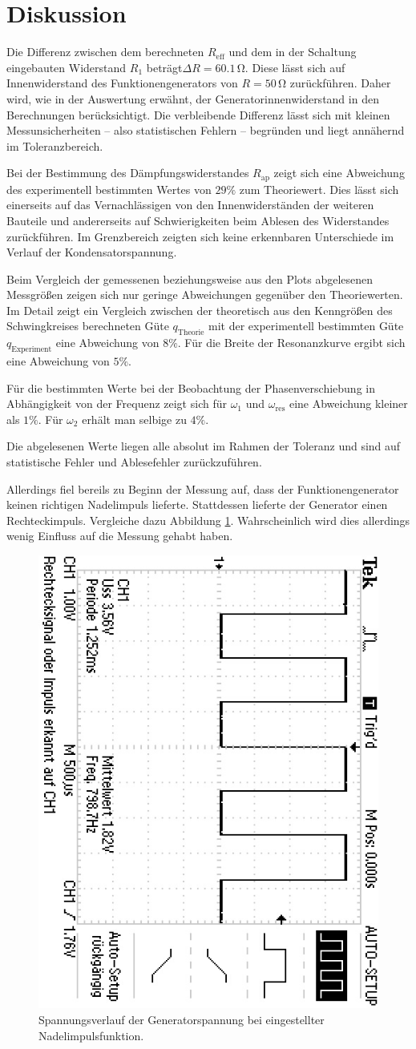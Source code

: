 \section{Diskussion}
\label{sec:Diskussion}
Die Differenz zwischen dem berechneten $R_\text{eff}$ und dem in der Schaltung eingebauten Widerstand $R_\text{1}$ beträgt$\Delta R=60.1 \,\si{\ohm}$.
Diese lässt sich auf Innenwiderstand des Funktionengenerators von $R=50\,\si{\ohm}$ zurückführen.
Daher wird, wie in der Auswertung erwähnt, der Generatorinnenwiderstand in den Berechnungen berücksichtigt.
Die verbleibende Differenz lässt sich mit kleinen Messunsicherheiten -- also statistischen Fehlern -- begründen und liegt annähernd im Toleranzbereich.

Bei der Bestimmung des Dämpfungswiderstandes $R_{\mathrm{ap}}$ zeigt sich eine Abweichung
des experimentell bestimmten Wertes von $29\%$ zum Theoriewert. Dies lässt sich einerseits
auf das Vernachlässigen von den Innenwiderständen der weiteren Bauteile und
andererseits auf Schwierigkeiten beim Ablesen des Widerstandes zurückführen. Im Grenzbereich zeigten
sich keine erkennbaren Unterschiede im Verlauf der Kondensatorspannung.

Beim Vergleich der gemessenen beziehungsweise aus den Plots abgelesenen Messgrößen zeigen sich nur geringe Abweichungen gegenüber den Theoriewerten.
Im Detail zeigt ein Vergleich zwischen der theoretisch aus den Kenngrößen des Schwingkreises berechneten Güte $q_\mathrm{Theorie}$ mit der experimentell bestimmten Güte $q_\mathrm{Experiment}$ eine Abweichung von $8\%$.
Für die Breite der Resonanzkurve ergibt sich eine Abweichung von $5\%$.

Für die bestimmten Werte bei der Beobachtung der Phasenverschiebung in Abhängigkeit von der
Frequenz zeigt sich für $\omega_1$ und $\omega_{\mathrm{res}}$ eine Abweichung kleiner als $1\%$. Für $\omega_2$ erhält man selbige zu $4\%$.

Die abgelesenen Werte liegen alle absolut im Rahmen der Toleranz und sind auf statistische Fehler
und Ablesefehler zurückzuführen.

Allerdings fiel bereils zu Beginn der Messung auf, dass der Funktionengenerator keinen richtigen Nadelimpuls lieferte. Stattdessen lieferte der Generator einen Rechteckimpuls. Vergleiche dazu Abbildung \ref{fig:blabliblub}.
Wahrscheinlich wird dies allerdings wenig Einfluss auf die Messung gehabt haben.

\begin{figure}
	\centering
	\caption{Spannungsverlauf der Generatorspannung bei eingestellter Nadelimpulsfunktion.}
	\label{fig:blabliblub}
	\includegraphics[width = 0.5 \textwidth, angle=90]{Bilder/a)rectangle/F0001TEK.JPG}
\end{figure}
